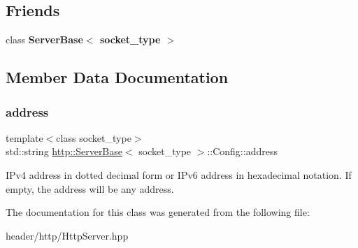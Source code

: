 \subsection*{Friends}
\begin{DoxyCompactItemize}
\item 
\mbox{\label{classhttp_1_1_server_base_1_1_config_a01d54a7e16ca437c98ec571deca98dfc}} 
class {\bfseries Server\+Base$<$ socket\+\_\+type $>$}
\end{DoxyCompactItemize}


\subsection{Member Data Documentation}
\mbox{\label{classhttp_1_1_server_base_1_1_config_ad0398c9e6bb43163dd91f0bc84854be9}} 
\subsubsection{\texorpdfstring{address}{address}}
{\footnotesize\ttfamily template$<$class socket\+\_\+type$>$ \\
std\+::string \hyperlink{classhttp_1_1_server_base}{http\+::\+Server\+Base}$<$ socket\+\_\+type $>$\+::Config\+::address}

I\+Pv4 address in dotted decimal form or I\+Pv6 address in hexadecimal notation. If empty, the address will be any address. 

The documentation for this class was generated from the following file\+:\begin{DoxyCompactItemize}
\item 
header/http/Http\+Server.\+hpp\end{DoxyCompactItemize}

